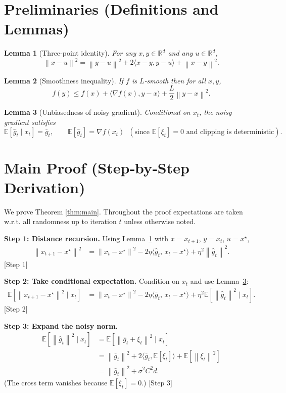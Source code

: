 \documentclass{article}
\newtheorem{lemma}{Lemma}
\newcommand{\E}{\mathbb{E}}
\newcommand{\R}{\mathbb{R}}
\newcommand{\norm}[1]{\left\lVert #1\right\rVert}
\begin{document}
\newpage

\section*{Preliminaries (Definitions and Lemmas)}
\begin{lemma}[Three‑point identity]\label{lem:three}
For any $x,y\in\R^{d}$ and any $u\in\R^{d}$,
\[
\norm{x-u}^{2}= \norm{y-u}^{2}+2\langle x-y, y-u\rangle+\norm{x-y}^{2}.
\]
\end{lemma}
\begin{lemma}[Smoothness inequality]\label{lem:smooth}
If $f$ is $L$‑smooth then for all $x,y$,
\[
f(y)\le f(x)+\langle\nabla f(x),y-x\rangle+\frac{L}{2}\norm{y-x}^{2}.
\]
\end{lemma}
\begin{lemma}[Unbiasedness of noisy gradient]\label{lem:unbiased}
Conditional on $x_t$, the noisy gradient satisfies
\[
\E[\hat g_t\mid x_t]=\bar g_t,\qquad
\E[\hat g_t]=\nabla f(x_t) \;\;(\text{since } \E[\xi_t]=0\text{ and clipping is deterministic}).
\]
\end{lemma}

\newpage

\section*{Main Proof (Step‑by‑Step Derivation)}
We prove Theorem \ref{thm:main}. Throughout the proof expectations are taken w.r.t. all randomness up to iteration $t$ unless otherwise noted.

\noindent\textbf{Step 1: Distance recursion.}
Using Lemma~\ref{lem:three} with $x=x_{t+1}$, $y=x_t$, $u=x^{\star}$,
\begin{align}
\norm{x_{t+1}-x^{\star}}^{2}
&= \norm{x_t-x^{\star}}^{2}
   -2\eta\langle\hat g_t,\,x_t-x^{\star}\rangle
   +\eta^{2}\norm{\hat g_t}^{2}. \tag{1}\label{eq:dist}
\end{align}
[Step 1]

\noindent\textbf{Step 2: Take conditional expectation.}
Condition on $x_t$ and use Lemma~\ref{lem:unbiased}:
\begin{align}
\E\!\left[\norm{x_{t+1}-x^{\star}}^{2}\mid x_t\right]
&= \norm{x_t-x^{\star}}^{2}
   -2\eta\langle \bar g_t,\,x_t-x^{\star}\rangle
   +\eta^{2}\E\!\left[\norm{\hat g_t}^{2}\mid x_t\right]. \tag{2}\label{eq:condexp}
\end{align}
[Step 2]

\noindent\textbf{Step 3: Expand the noisy norm.}
\begin{align}
\E\!\left[\norm{\hat g_t}^{2}\mid x_t\right]
&= \E\!\left[\norm{\bar g_t+\xi_t}^{2}\mid x_t\right] \nonumber\\
&= \norm{\bar g_t}^{2}
   +2\langle\bar g_t,\E[\xi_t]\rangle
   +\E\!\left[\norm{\xi_t}^{2}\right] \nonumber\\
&= \norm{\bar g_t}^{2} + \sigma^{2}C^{2}d . \tag{3}\label{eq:norm}
\end{align}
(The cross term vanishes because $\E[\xi_t]=0$.) [Step 3]
\end{document}
